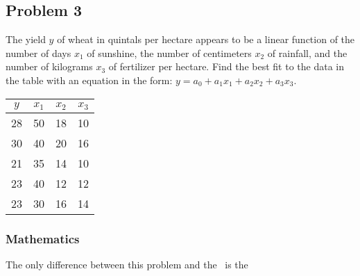\subsection{Problem 3}%
\label{sec:problem_3}
The yield $y$ of wheat in quintals per hectare appears to be a linear function of the
number of days $x_1$ of sunshine, the number of centimeters $x_2$ of rainfall, and the
number of kilograms $x_3$ of fertilizer per hectare. Find the best fit to the data in
the table with an equation in the form: $y=a_0+a_1x_1+a_2x_2+a_3x_3$.

\begin{center}
\begin{tabular}{|c|c|c|c|}
  \hline
  $y$ & $x_1$ & $x_2$ & $x_3$ \\
  \hline
  28 & 50 & 18 & 10 \\
  \hline
  30 & 40 & 20 & 16 \\
  \hline
  21 & 35 & 14 & 10 \\
  \hline
  23 & 40 & 12 & 12 \\
  \hline
  23 & 30 & 16 & 14 \\
  \hline
\end{tabular}
\end{center}
\subsubsection*{Mathematics}
The only difference between this problem and the~ is the 
